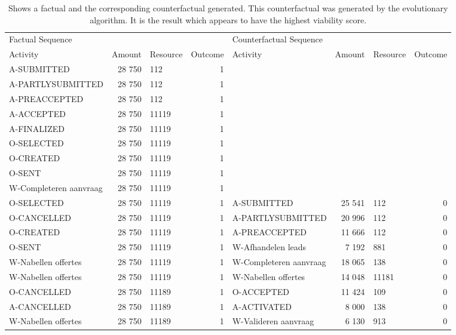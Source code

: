 \begin{table}
\caption{Shows a factual and the corresponding counterfactual generated. This counterfactual was generated by the evolutionary algorithm. It is the result which appears to have the highest viability score.}
\label{tbl:example-cf-evo}
\begin{tabular}{lrlrlrlr}
\toprule
\multicolumn{4}{l}{Factual Sequence} & \multicolumn{4}{l}{Counterfactual Sequence} \\
Activity & Amount & Resource & Outcome & Activity & Amount & Resource & Outcome \\
\midrule
A-SUBMITTED & 28 750 & 112 & 1 &  &  &  &  \\
A-PARTLYSUBMITTED & 28 750 & 112 & 1 &  &  &  &  \\
A-PREACCEPTED & 28 750 & 112 & 1 &  &  &  &  \\
A-ACCEPTED & 28 750 & 11119 & 1 &  &  &  &  \\
A-FINALIZED & 28 750 & 11119 & 1 &  &  &  &  \\
O-SELECTED & 28 750 & 11119 & 1 &  &  &  &  \\
O-CREATED & 28 750 & 11119 & 1 &  &  &  &  \\
O-SENT & 28 750 & 11119 & 1 &  &  &  &  \\
W-Completeren aanvraag & 28 750 & 11119 & 1 &  &  &  &  \\
O-SELECTED & 28 750 & 11119 & 1 & A-SUBMITTED & 25 541 & 112 & 0 \\
O-CANCELLED & 28 750 & 11119 & 1 & A-PARTLYSUBMITTED & 20 996 & 112 & 0 \\
O-CREATED & 28 750 & 11119 & 1 & A-PREACCEPTED & 11 666 & 112 & 0 \\
O-SENT & 28 750 & 11119 & 1 & W-Afhandelen leads & 7 192 & 881 & 0 \\
W-Nabellen offertes & 28 750 & 11119 & 1 & W-Completeren aanvraag & 18 065 & 138 & 0 \\
W-Nabellen offertes & 28 750 & 11119 & 1 & W-Nabellen offertes & 14 048 & 11181 & 0 \\
O-CANCELLED & 28 750 & 11189 & 1 & O-ACCEPTED & 11 424 & 109 & 0 \\
A-CANCELLED & 28 750 & 11189 & 1 & A-ACTIVATED & 8 000 & 138 & 0 \\
W-Nabellen offertes & 28 750 & 11189 & 1 & W-Valideren aanvraag & 6 130 & 913 & 0 \\
\bottomrule
\end{tabular}
\end{table}
